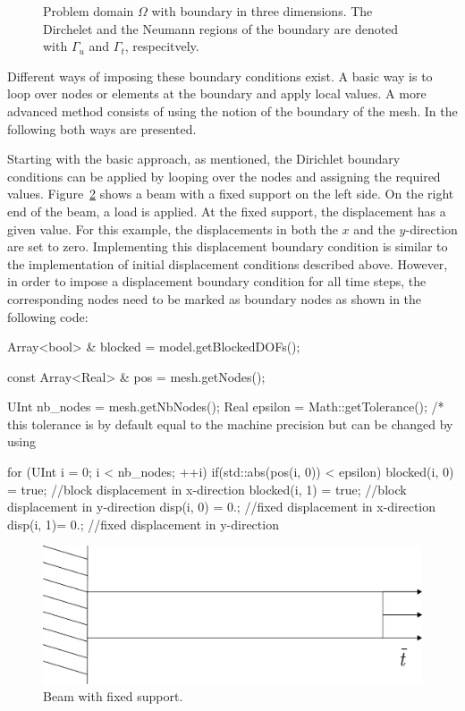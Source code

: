 \begin{figure} \centering
\def\svgwidth{0.5\columnwidth}
  
  \caption{Problem domain $\Omega$ with boundary in three dimensions. The Dirchelet and the Neumann regions of the boundary are denoted with $\Gamma_u$ and $\Gamma_t$, respecitvely.\label{fig:smm:boundaries}}
  \label{fig:problemDomain}
\end{figure}

Different ways of imposing these boundary conditions exist. A basic
way is to loop over nodes or elements at the boundary and apply local
values. A more advanced method consists of using the notion of the
boundary of the mesh. In the following both ways are presented.

Starting with the basic approach, as mentioned, the Dirichlet boundary
conditions can be applied by looping over the nodes and assigning the
required values. Figure~\ref{fig:smm:dirichlet_bc} shows a beam with a
fixed support on the left side. On the right end of the beam, a load
is applied. At the fixed support, the displacement has a given
value. For this example, the displacements in both the $x$ and the
$y$-direction are set to zero. Implementing this displacement boundary
condition is similar to the implementation of initial displacement
conditions described above. However, in order to impose a displacement
boundary condition for all time steps, the corresponding nodes need to
be marked as boundary nodes as shown in the following code:

\begin{cpp}
Array<bool> & blocked = model.getBlockedDOFs();

const Array<Real> & pos = mesh.getNodes();

UInt nb_nodes = mesh.getNbNodes();
Real epsilon = Math::getTolerance();
/* this tolerance is by default equal to the machine precision but can be changed by using %

for (UInt i = 0; i < nb_nodes; ++i) {
  if(std::abs(pos(i, 0)) < epsilon) {
    blocked(i, 0) = true; //block displacement in x-direction
    blocked(i, 1) = true; //block displacement in y-direction
    disp(i, 0) = 0.; //fixed displacement in x-direction
    disp(i, 1)= 0.; //fixed displacement in y-direction
  }
}
\end{cpp}

\begin{figure}[!htb]
  \centering
  \includegraphics[scale=0.4]{figures/dirichlet}
  \caption{Beam with fixed support.\label{fig:smm:dirichlet_bc}}
\end{figure}

